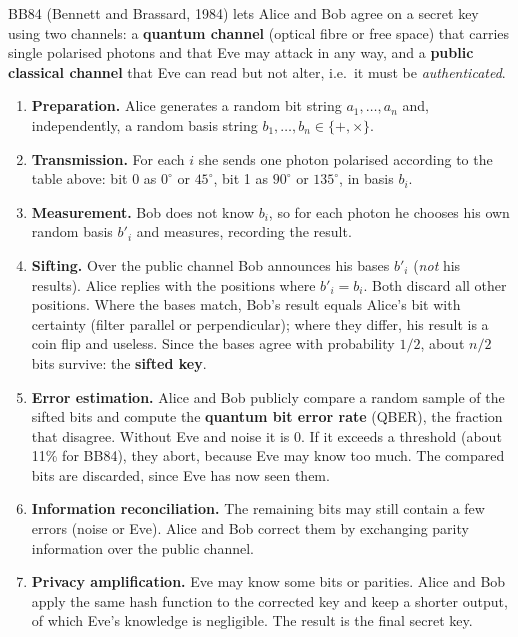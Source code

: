 BB84 (Bennett and Brassard, 1984) lets Alice and Bob agree on a secret key using two channels: a \textbf{quantum channel} (optical fibre or free space) that carries single polarised photons and that Eve may attack in any way, and a \textbf{public classical channel} that Eve can read but not alter, i.e.\ it must be \emph{authenticated}.
\begin{enumerate}
  \item \textbf{Preparation.} Alice generates a random bit string $a_1, \dots, a_n$ and, independently, a random basis string $b_1, \dots, b_n \in \{+, \times\}$.
  \item \textbf{Transmission.} For each $i$ she sends one photon polarised according to the table above: bit 0 as $0^\circ$ or $45^\circ$, bit 1 as $90^\circ$ or $135^\circ$, in basis $b_i$.
  \item \textbf{Measurement.} Bob does not know $b_i$, so for each photon he chooses his own random basis $b'_i$ and measures, recording the result.
  \item \textbf{Sifting.} Over the public channel Bob announces his bases $b'_i$ (\emph{not} his results). Alice replies with the positions where $b'_i = b_i$. Both discard all other positions. Where the bases match, Bob's result equals Alice's bit with certainty (filter parallel or perpendicular); where they differ, his result is a coin flip and useless. Since the bases agree with probability $1/2$, about $n/2$ bits survive: the \textbf{sifted key}.
  \item \textbf{Error estimation.} Alice and Bob publicly compare a random sample of the sifted bits and compute the \textbf{quantum bit error rate} (QBER), the fraction that disagree. Without Eve and noise it is 0. If it exceeds a threshold (about 11\% for BB84), they abort, because Eve may know too much. The compared bits are discarded, since Eve has now seen them.
  \item \textbf{Information reconciliation.} The remaining bits may still contain a few errors (noise or Eve). Alice and Bob correct them by exchanging parity information over the public channel.
  \item \textbf{Privacy amplification.} Eve may know some bits or parities. Alice and Bob apply the same hash function to the corrected key and keep a shorter output, of which Eve's knowledge is negligible. The result is the final secret key.
\end{enumerate}

